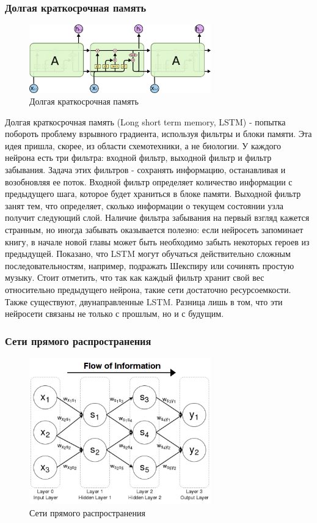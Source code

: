 \subsubsection{Долгая краткосрочная память}
\begin{figure}[htbp]
\centering
\caption{Долгая краткосрочная память}
\includegraphics[width=0.7\textwidth]{fig/lstm}
\end{figure}
Долгая краткосрочная память (Long short term memory, LSTM) - попытка побороть проблему взрывного градиента, используя фильтры и блоки памяти. Эта идея пришла, скорее, из области схемотехники, а не биологии. У каждого нейрона есть три фильтра: входной фильтр, выходной фильтр и фильтр забывания. Задача этих фильтров - сохранять информацию, останавливая и возобновляя ее поток. Входной фильтр определяет количество информации с предыдущего шага, которое будет храниться в блоке памяти. Выходной фильтр занят тем, что определяет, сколько информации о текущем состоянии узла получит следующий слой. Наличие фильтра забывания на первый взгляд кажется странным, но иногда забывать оказывается полезно: если нейросеть запоминает книгу, в начале новой главы может быть необходимо забыть некоторых героев из предыдущей. Показано, что LSTM могут обучаться действительно сложным последовательностям, например, подражать Шекспиру или сочинять простую музыку. Стоит отметить, что так как каждый фильтр хранит свой вес относительно предыдущего нейрона, такие сети достаточно ресурсоемкости. Также существуют, двунаправленные LSTM. Разница лишь в том, что эти нейросети связаны не только с прошлым, но и с будущим.

\subsubsection{Сети прямого распространения}
\begin{figure}[htbp]
\centering
\caption{Сети прямого распространения}
\includegraphics[width=0.7\textwidth]{fig/fnn}
\end{figure}

